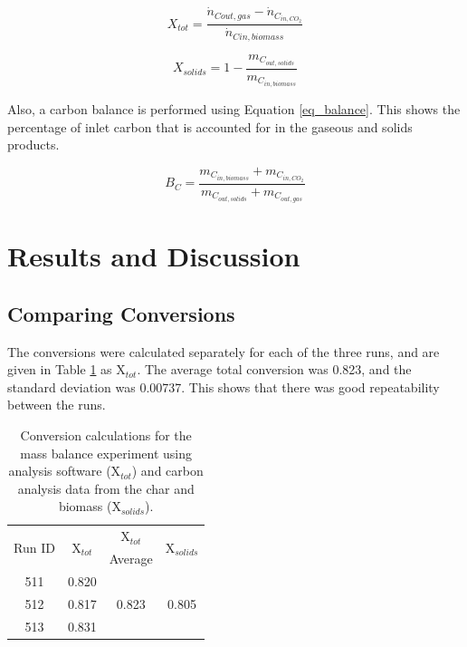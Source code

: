 \documentclass[11pt,twocolumn]{article}
\begin{document}
\begin{equation}
	X_{tot} = \frac{\dot{n}_{C out,gas} - \dot{n}_{C_{in,CO_2}}}{\dot{n}_{C in,biomass}}
	\label{eq_total}
\end{equation}

\begin{equation}
	X_{solids} = 1- \frac{m_{C_{out, solids}}}{m_{C_{in, biomass}}}
	\label{eq_x_solids}
\end{equation}

Also, a carbon balance is performed using Equation \ref{eq_balance}.  This shows the percentage of inlet carbon that is accounted for in the gaseous and solids products.

\begin{equation}
	B_C = \frac{m_{C_{in, biomass}} + m_{C_{in, CO_2}}}{m_{C_{out, solids}} + m_{C_{out, gas}}}
	\label{eq_balance}
\end{equation}

\section*{Results and Discussion}



\subsection*{Comparing Conversions}

The conversions were calculated separately for each of the three runs, and are given in Table \ref{conversions} as X$_{tot}$.  The average total conversion was 0.823, and the standard deviation was 0.00737.  This shows that there was good repeatability between the runs.


\begin{table}
	\centering
	\caption{Conversion calculations for the mass balance experiment using analysis software (X$_{tot}$) and carbon analysis data from the char and biomass (X$_{solids}$).}
	\label{conversions}
	\begin{tabular}{c c c c}
	\toprule
	\multirow{2}{*}{Run ID}	&	\multirow{2}{*}{X$_{tot}$}	& 	X$_{tot}$				&\multirow{2}{*}{X$_{solids}$}	\\ 
	{}					&	{}						& 	Average				&	{}						\\
	\midrule
	511					&	0.820					&	\multirow{3}{*}{0.823}	&	\multirow{3}{*}{0.805}		\\
	512					&	0.817					&	{}					&	{}						\\
	513					&	0.831					&	{}					&	{}						\\
	\bottomrule
	\end{tabular}
\end{table}
\end{document}
